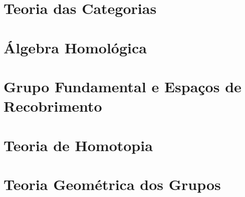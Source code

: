 \documentclass{book}
\begin{document}



\tableofcontents

\setcounter{page}{0}

\chapter{Teoria das Categorias}



\chapter{Álgebra Homológica}



\chapter{Grupo Fundamental e Espaços de Recobrimento}

\chapter{Teoria de Homotopia}

\chapter{Teoria Geométrica dos Grupos}
\end{document}
